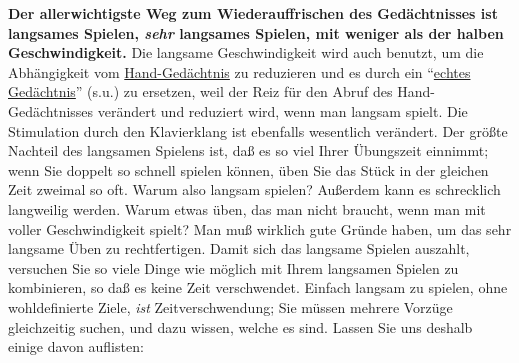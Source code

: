 \textbf{Der allerwichtigste Weg zum Wiederauffrischen des Gedächtnisses ist langsames Spielen, \textit{sehr} langsames Spielen, mit weniger als der halben Geschwindigkeit.}
Die langsame Geschwindigkeit wird auch benutzt, um die Abhängigkeit vom \hyperlink{c1iii6d}{Hand-Gedächtnis} zu reduzieren und es durch ein \enquote{\hyperlink{c1iii6tastatur}{echtes Gedächtnis}} (s.u.) zu ersetzen, weil der Reiz für den Abruf des Hand-Gedächtnisses verändert und reduziert wird, wenn man langsam spielt.
Die Stimulation durch den Klavierklang ist ebenfalls wesentlich verändert.
Der größte Nachteil des langsamen Spielens ist, daß es so viel Ihrer Übungszeit einnimmt; wenn Sie doppelt so schnell spielen können, üben Sie das Stück in der gleichen Zeit zweimal so oft.
Warum also langsam spielen?
Außerdem kann es schrecklich langweilig werden.
Warum etwas üben, das man nicht braucht, wenn man mit voller Geschwindigkeit spielt?
Man muß wirklich gute Gründe haben, um das sehr langsame Üben zu rechtfertigen.
Damit sich das langsame Spielen auszahlt, versuchen Sie so viele Dinge wie möglich mit Ihrem langsamen Spielen zu kombinieren, so daß es keine Zeit verschwendet.
Einfach langsam zu spielen, ohne wohldefinierte Ziele, \textit{ist} Zeitverschwendung; Sie müssen mehrere Vorzüge gleichzeitig suchen, und dazu wissen, welche es sind. Lassen Sie uns deshalb einige davon auflisten:

